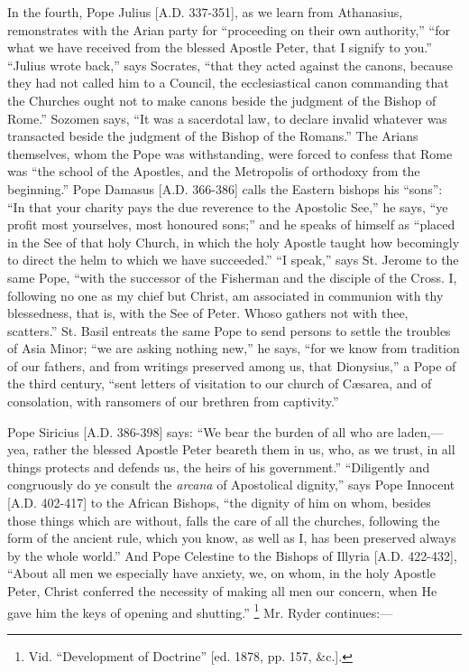 In the fourth, Pope Julius [A.D.
337-351], as we learn from Athanasius, remonstrates with the Arian
party for ``proceeding on their own authority,'' ``for what we have
received from the blessed Apostle Peter, that I signify to you.'' ``Julius
wrote back,'' says Socrates, ``that they acted against the canons,
because they had not called him to a Council, the ecclesiastical canon
commanding that the Churches ought not to make canons beside the
judgment of the Bishop of Rome.'' Sozomen says, ``It was a sacerdotal
law, to declare invalid whatever was transacted beside the judgment of
the Bishop of the Romans.'' The Arians themselves, whom the Pope was
withstanding, were forced to confess that Rome was ``the school of the
Apostles, and the Metropolis of orthodoxy from the beginning.'' Pope
Damasus [A.D. 366-386] calls the
Eastern bishops his ``sons'': ``In that your charity pays the due
reverence to the Apostolic See,'' he says, ``ye profit most yourselves,
most honoured sons;'' and he speaks of himself as ``placed in the See of
that holy Church, in which the holy Apostle taught how becomingly to
direct the helm to which we have succeeded.'' ``I speak,'' says St. Jerome to the same Pope, ``with the
successor of the Fisherman and the disciple of the Cross. I, following
no one as my chief but Christ, am associated in communion with thy
blessedness, that is, with the See of Peter. Whoso gathers not with
thee, scatters.'' St. Basil entreats the same Pope to send persons to
settle the troubles of Asia Minor; ``we are asking nothing new,'' he
says, ``for we know from tradition of our fathers, and from writings
preserved among us, that Dionysius,'' a Pope of the third century, ``sent
letters of visitation to our church of Cæsarea, and of consolation,
with ransomers of our brethren from captivity.''

Pope Siricius [A.D.
386-398] says: ``We bear the burden of all who are laden,—yea, rather
the blessed Apostle Peter beareth them in us, who, as we trust, in all
things protects and defends us, the heirs of his government.'' ``Diligently
and congruously do ye consult the \emph{arcana} of Apostolical
dignity,'' says Pope Innocent [A.D.
402-417] to the African Bishops, ``the dignity of him on whom, besides
those things which are without, falls the care of all the churches,
following the form of the ancient rule, which you know, as well as I,
has been preserved always by the whole world.'' And Pope Celestine to
the Bishops of Illyria [A.D.
422-432], ``About all men we especially have anxiety, we, on whom, in
the holy Apostle Peter, Christ conferred the necessity of making all
men our concern, when He gave him the keys of opening and shutting.'' \footnote{Vid. ``Development of
Doctrine'' [ed. 1878, pp.
157, \&c.].}
Mr. Ryder continues:—

